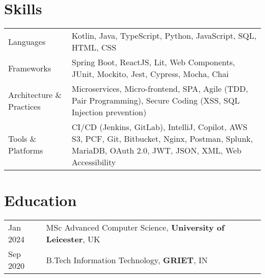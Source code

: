 \documentclass[a4paper,12pt]{article}
\begin{document}
\section{Skills}
\begin{tabularx}{\linewidth}{@{}l X@{}}
Languages & Kotlin, Java, TypeScript, Python, JavaScript, SQL, HTML, CSS \\
Frameworks & Spring Boot, ReactJS, Lit, Web Components, JUnit, Mockito, Jest, Cypress, Mocha, Chai \\
Architecture \& Practices & Microservices, Micro-frontend, SPA, Agile (TDD, Pair Programming), Secure Coding (XSS, SQL Injection prevention) \\
Tools \& Platforms & CI/CD (Jenkins, GitLab), IntelliJ, Copilot, AWS S3, PCF, Git, Bitbucket, Nginx, Postman, Splunk, MariaDB, OAuth 2.0, JWT, JSON, XML, Web Accessibility \\
\end{tabularx}
\section{Education}
\begin{tabularx}{\linewidth}{@{}l X@{}} 	
Jan 2024 & MSc Advanced Computer Science, \textbf{University of Leicester}, UK \\
Sep 2020 & B.Tech Information Technology, \textbf{GRIET}, IN \\
\end{tabularx}
\end{document}
